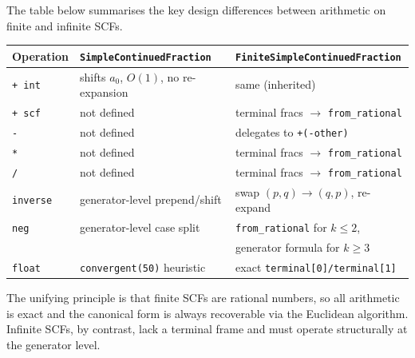 \begin{remark}
  The table below summarises the key design differences between arithmetic on
  finite and infinite SCFs.

  \begin{center}
  \begin{tabular}{lll}
    \toprule
    Operation & \texttt{SimpleContinuedFraction} & \texttt{FiniteSimpleContinuedFraction} \\
    \midrule
    \texttt{+\,int}   & shifts $a_0$, $O(1)$, no re-expansion & same (inherited) \\
    \texttt{+\,scf}   & not defined & terminal fracs $\to$ \texttt{from\_rational} \\
    \texttt{-}        & not defined & delegates to \texttt{+(-other)} \\
    \texttt{*}        & not defined & terminal fracs $\to$ \texttt{from\_rational} \\
    \texttt{/}        & not defined & terminal fracs $\to$ \texttt{from\_rational} \\
    \texttt{inverse}  & generator-level prepend/shift & swap $(p,q)\to(q,p)$, re-expand \\
    \texttt{neg}      & generator-level case split & \texttt{from\_rational} for $k\leq 2$, \\
                      &                            & generator formula for $k\geq 3$ \\
    \texttt{float}    & \texttt{convergent(50)} heuristic & exact \texttt{terminal[0]/terminal[1]} \\
    \bottomrule
  \end{tabular}
  \end{center}

  The unifying principle is that finite SCFs are rational numbers, so all
  arithmetic is exact and the canonical form is always recoverable via the
  Euclidean algorithm.  Infinite SCFs, by contrast, lack a terminal frame
  and must operate structurally at the generator level.
\end{remark}